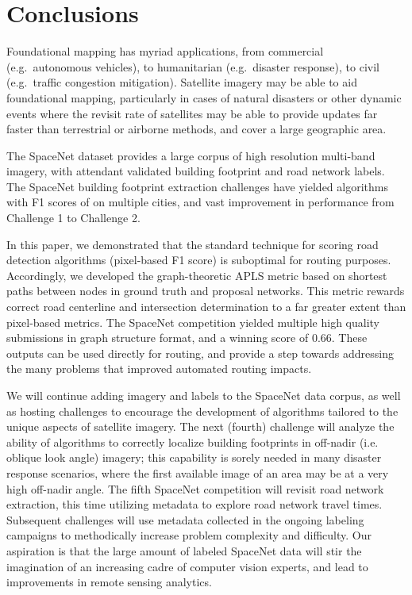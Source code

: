 \documentclass{article}
\begin{document}
\section{Conclusions}\label{conclusions}

Foundational mapping has myriad applications, from commercial (e.g.~autonomous vehicles), to humanitarian (e.g.~disaster response), to civil (e.g.~traffic congestion mitigation).  
Satellite imagery may be able to aid foundational mapping, particularly in cases of natural disasters or other dynamic events where the revisit rate of satellites may be able to provide updates far faster than terrestrial or airborne methods, and cover a large geographic area.

The SpaceNet dataset provides a large corpus of high resolution multi-band imagery, with attendant validated building footprint and road network labels.  The SpaceNet building footprint extraction challenges have yielded algorithms with F1 scores of  on multiple cities, and vast improvement in performance from Challenge 1 to Challenge 2.    


In this paper, we demonstrated that the standard technique for scoring road detection algorithms (pixel-based F1 score) is suboptimal for routing purposes. Accordingly, we developed the graph-theoretic APLS metric based on shortest paths between nodes in ground truth and proposal networks. This metric rewards correct road centerline and intersection determination to a far greater extent than pixel-based metrics.  The SpaceNet competition yielded multiple high quality submissions in graph structure format, and a winning score of 0.66.  These outputs can be used directly for routing, and provide a step towards addressing the many problems that improved automated routing impacts.  

We will continue adding imagery and labels to the SpaceNet data corpus, as well as hosting challenges to encourage the development of algorithms tailored to the unique aspects of satellite imagery.  
The next (fourth) challenge will analyze the ability of algorithms to correctly localize building footprints in off-nadir (i.e. oblique look angle) imagery; this capability is sorely needed in many disaster response scenarios, where the first available image of an area may be at a very high off-nadir angle. The fifth SpaceNet competition will revisit road network extraction, this time utilizing metadata to explore road network travel times. Subsequent challenges will use metadata collected in the ongoing labeling campaigns to methodically increase problem complexity and difficulty.
Our aspiration is that the large amount of labeled SpaceNet data will stir the imagination of an increasing cadre of computer vision experts, and lead to improvements in remote sensing analytics.
\end{document}
